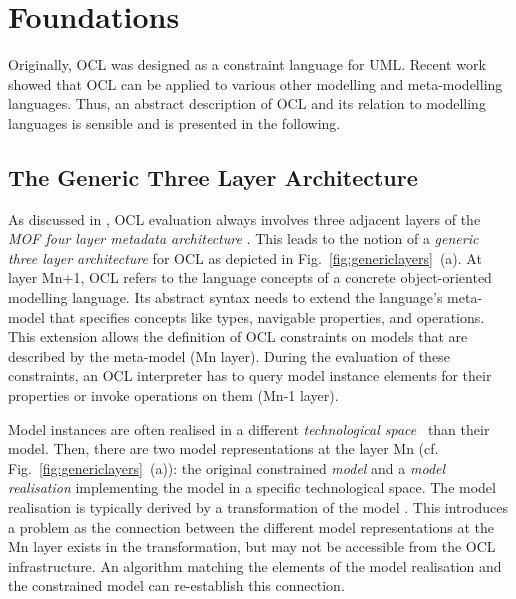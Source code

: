 \section{Foundations}
\label{sec:foundation}

Originally, OCL was designed as a constraint language for UML. Recent work showed
that OCL can be applied to various other modelling and meta-modelling languages. Thus,
an abstract description of OCL and its relation to modelling languages is sensible
and is presented in the following.

\subsection{The Generic Three Layer Architecture}
As discussed in \cite{demuthRGWS09}, OCL evaluation
always involves three adjacent layers of the \emph{MOF four layer metadata
architecture} \cite{spec:MOF1-4}. This leads to the notion of 
a \emph{generic three layer architecture} for OCL as depicted in
Fig.~\ref{fig:genericlayers}~(a). 
At layer Mn+1, OCL refers to the language
concepts of a concrete object-oriented modelling language. 
Its abstract syntax needs to extend the language's meta-model that specifies concepts like
types, navigable properties, and operations.
This extension allows the definition of
OCL constraints on models that are described by the meta-model (Mn layer).
During the evaluation of these constraints, an OCL interpreter has to query model
instance elements for their properties or invoke operations on them (Mn-1 layer).

Model instances are often realised in
a different \emph{technological space}~\cite{kurtev2002technological} than their model. Then, there are two model
representations at the layer Mn (cf.
Fig.~\ref{fig:genericlayers}~(a)): the original constrained \emph{model} and a
\emph{model realisation} implementing the model in a specific technological space. The
model realisation is typically derived by a transformation of the model
\cite{WWW:EMF}. 
This introduces a problem as the connection between the different model representations
at the Mn layer exists in the transformation, but may not be accessible from the OCL infrastructure.
An algorithm matching the elements of the model realisation and the constrained model can re-establish
this connection.


